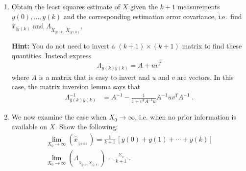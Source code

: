 \documentclass[letterpaper,12pt]{article}
\begin{document}
\begin{enumerate}
\begin{enumerate}

\item
Obtain the least squares estimate of $X$ given the $k+1$ measurements $y(0), \ldots, y(k)$ and the corresponding estimation error covariance, i.e.\ find $\hat{x}_{|\bar{y}(k)}$ and $\Lambda_{\tilde{X}_{|\bar{y}(k)} \tilde{X}_{|\bar{y}(k)}}$.

\textbf{Hint:} You do not need to invert a $(k+1) \times (k+1)$ matrix to find these quantities. Instead express
\begin{align*}
    \Lambda_{\bar{y}(k) \bar{y}(k)} = A + uv^T
\end{align*}
where $A$ is a matrix that is easy to invert and $u$ and $v$ are vectors. In this case, the matrix inversion lemma says that
\begin{align*}
    \Lambda_{\bar{y}(k) \bar{y}(k)}^{-1} %
    & = A^{-1} - \frac{1}{1+v^T A^{-1} u} A^{-1} u v^T A^{-1} \; .
\end{align*}

\item
We now examine the case when $X_0  \to \infty$, i.e. when no prior information is available on $X$. Show the following:
\begin{gather*}
    \lim_{X_0  \to \infty} \left( \hat{x}_{_{|\bar{y}(k)}} \right)
        = \frac{1}{k+1}\, [ y(0) + y(1) + \cdots + y(k) ] \\
    \lim_{X_0  \to \infty} \left( \Lambda_{_{\tilde{X}_{|\bar{y}(k)} \tilde{X}_{|\bar{y}(k)}}} \right)
        = \frac{\Sigma_{_V}}{k+1} \; .
\end{gather*}

\end{enumerate}



\end{enumerate}
\end{document}
